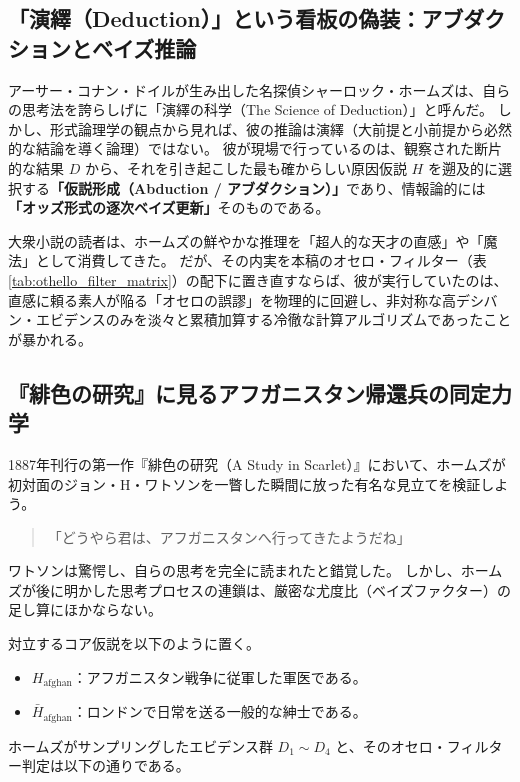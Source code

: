 \subsection{「演繹（Deduction）」という看板の偽装：アブダクションとベイズ推論}
アーサー・コナン・ドイルが生み出した名探偵シャーロック・ホームズは、自らの思考法を誇らしげに「演繹の科学（The Science of Deduction）」と呼んだ。
しかし、形式論理学の観点から見れば、彼の推論は演繹（大前提と小前提から必然的な結論を導く論理）ではない。
彼が現場で行っているのは、観察された断片的な結果 $D$ から、それを引き起こした最も確からしい原因仮説 $H$ を遡及的に選択する\textbf{「仮説形成（Abduction / アブダクション）」}であり、情報論的には\textbf{「オッズ形式の逐次ベイズ更新」}そのものである。

大衆小説の読者は、ホームズの鮮やかな推理を「超人的な天才の直感」や「魔法」として消費してきた。
だが、その内実を本稿のオセロ・フィルター（表\ref{tab:othello_filter_matrix}）の配下に置き直すならば、彼が実行していたのは、直感に頼る素人が陥る「オセロの誤謬」を物理的に回避し、非対称な高デシバン・エビデンスのみを淡々と累積加算する冷徹な計算アルゴリズムであったことが暴かれる。

\subsection{『緋色の研究』に見るアフガニスタン帰還兵の同定力学}
1887年刊行の第一作『緋色の研究（A Study in Scarlet）』において、ホームズが初対面のジョン・H・ワトソンを一瞥した瞬間に放った有名な見立てを検証しよう。
\begin{quote}
「どうやら君は、アフガニスタンへ行ってきたようだね」
\end{quote}
ワトソンは驚愕し、自らの思考を完全に読まれたと錯覚した。
しかし、ホームズが後に明かした思考プロセスの連鎖は、厳密な尤度比（ベイズファクター）の足し算にほかならない。

対立するコア仮説を以下のように置く。
\begin{itemize}
  \item $H_{\mathrm{afghan}}$：アフガニスタン戦争に従軍した軍医である。
  \item $\bar{H}_{\mathrm{afghan}}$：ロンドンで日常を送る一般的な紳士である。
\end{itemize}

ホームズがサンプリングしたエビデンス群 $D_1 \sim D_4$ と、そのオセロ・フィルター判定は以下の通りである。

